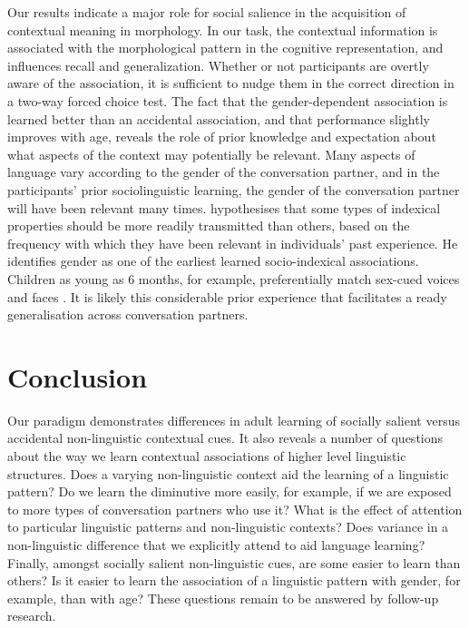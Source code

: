 \documentclass{frontiersSCNS} %
\begin{document}
Our results indicate a major role for social salience in the acquisition of contextual meaning in  morphology. In our task, the contextual information is associated with the morphological pattern in the cognitive representation, and influences  recall and generalization.   Whether or not participants  are overtly aware of the association, it is sufficient to nudge them in the correct direction in a two-way forced choice test.  The fact that the gender-dependent association is learned better than an accidental association, and that performance slightly improves with age, reveals the role of prior knowledge and expectation about what aspects of the context may potentially be relevant.  Many aspects of language vary according to the gender of the conversation partner, and in the participants' prior sociolinguistic learning, the gender of the conversation partner will have been relevant many times.  \cite{foulkes2010exploring} hypothesises that some types of indexical properties should be more readily transmitted than others, based on the frequency with which they have been relevant in individuals' past experience.  He identifies gender as one of the earliest learned socio-indexical associations.  Children as young as 6 months, for example, preferentially match sex-cued voices and faces \citep{walker1991infants}.  It is likely this considerable prior experience that facilitates a ready generalisation across conversation partners.

\section{Conclusion}
Our paradigm demonstrates differences in adult learning of socially salient versus accidental non-linguistic contextual cues. It also reveals a number of questions about the way we learn contextual associations of higher level linguistic structures. Does a varying non-linguistic context aid the learning of a linguistic pattern? Do we learn the diminutive more easily, for example, if we are exposed to more types of conversation partners who use it? What is the effect of attention to particular linguistic patterns and non-linguistic contexts? Does variance in a non-linguistic difference that we explicitly attend to aid language learning? Finally, amongst socially salient non-linguistic cues, are some easier to learn than others? Is it easier to learn the association of a linguistic pattern with gender, for example, than with age?  These questions remain to be answered by follow-up research. 
\end{document}
